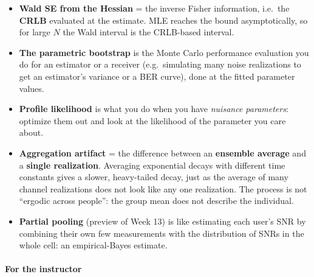 \begin{itemize}
\tightlist
\item
  \textbf{Wald SE from the Hessian} = the inverse Fisher information,
  i.e.~the \textbf{CRLB} evaluated at the estimate. MLE reaches the
  bound asymptotically, so for large \(N\) the Wald interval is the
  CRLB-based interval.
\item
  \textbf{The parametric bootstrap} is the Monte Carlo performance
  evaluation you do for an estimator or a receiver (e.g.~simulating many
  noise realizations to get an estimator's variance or a BER curve),
  done at the fitted parameter values.
\item
  \textbf{Profile likelihood} is what you do when you have
  \emph{nuisance parameters}: optimize them out and look at the
  likelihood of the parameter you care about.
\item
  \textbf{Aggregation artifact} = the difference between an
  \textbf{ensemble average} and a \textbf{single realization}. Averaging
  exponential decays with different time constants gives a slower,
  heavy-tailed decay, just as the average of many channel realizations
  does not look like any one realization. The process is not ``ergodic
  across people'': the group mean does not describe the individual.
\item
  \textbf{Partial pooling} (preview of Week 13) is like estimating each
  user's SNR by combining their own few measurements with the
  distribution of SNRs in the whole cell: an empirical-Bayes estimate.
\end{itemize}

\paragraph{For the instructor}


